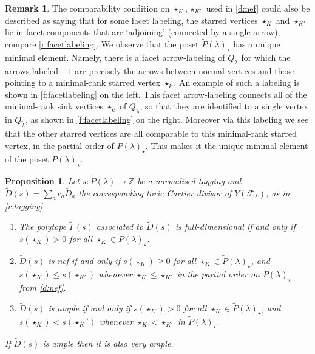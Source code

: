 \documentclass{amsart}
\newtheorem{prop}[thm]{Proposition}
\theoremstyle{definition}
\newtheorem{rem}[thm]{Remark}
\numberwithin{equation}{section}
\newcommand{\FF}{\mathcal{F}}
\newcommand{\Z}{\mathbb{Z}}
\begin{document}
\begin{rem}\label{r:StarPoset}
	The comparability  condition on $\star_K,\star_{K'}$ used in \cref{d:nef}  could also be described as saying that  for some facet labeling, the starred vertices $\star_K$ and $\star_{K'}$ lie in facet components that are `adjoining' (connected by a single arrow), 
	compare \cref{r:facetlabeling}. We observe that the poset $\widetilde P(\lambda)_\star$ has a unique minimal element. Namely, there is a facet arrow-labeling of $Q_{\lambda}$ for which the arrows labeled $-1$ are precisely the arrows between normal vertices and those pointing to a minimal-rank starred vertex $\star_k$. An example of such a labeling is shown in \cref{f:facetlabeling} on the left. This facet arrow-labeling connects all of the minimal-rank  sink vertices $\star_k$ of $Q_\lambda$, so that they are identified to a single vertex in $Q_{\widetilde \lambda}$, as shown in \cref{f:facetlabeling} on the right. Moreover via this labeling we see that the other starred vertices are all comparable to this minimal-rank starred vertex, in the partial order of $\widetilde P(\lambda)_\star$. This makes it the unique minimal element of the poset $\widetilde P(\lambda)_\star$. 
\end{rem}  
  
\begin{prop}\label{p:toricCartierAmple} 
Let $s:\widetilde P(\lambda)\to \Z$ be a normalised tagging and $\widetilde D(s)=\sum_a c_a\widetilde D_a$ the corresponding toric Cartier divisor of $Y(\FF_\lambda)$, as in \cref{r:tagging}. 
\begin{enumerate}
\item The polytope $\widetilde \Gamma(s)$ associated to $\widetilde D(s)$ is full-dimensional  if and only if $s(\star_K)>0$ 
	for all $\star_K\in\widetilde P(\lambda)_\star$. 
\item $\widetilde D(s)$ is \emph{nef} if and only if  $s(\star_K)\ge 0$ 
	for all $\star_K\in\widetilde P(\lambda)_\star$,
		and $s(\star_K)\le s(\star_{K'})$ whenever $\star_K\le \star_{K'}$ 
		in the partial order on
		$\widetilde P(\lambda)_\star$ from
\cref{d:nef}. 
\item $\widetilde D(s)$ is \emph{ample} if and only if $s(\star_K)> 0$ 
	for all $\star_K\in\widetilde P(\lambda)_\star$,
	and $s(\star_K)< s(\star_K')$ whenever $\star_K <\star_{K'}$ in 
		$\widetilde P(\lambda)_\star$.  
\end{enumerate} 
If $\widetilde D(s)$ is ample then it is also very ample. 
\end{prop}
\end{document}

